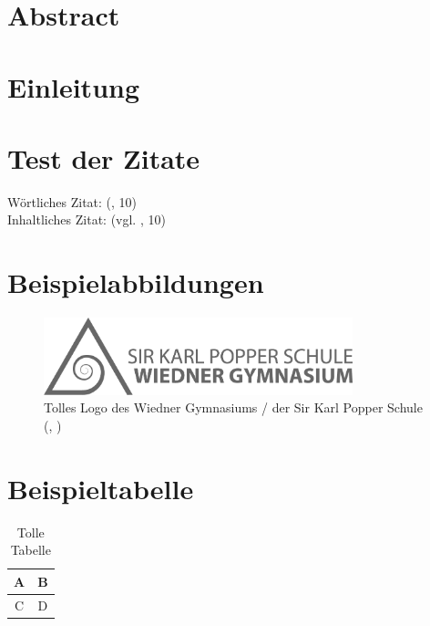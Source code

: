 \documentclass[12pt, ngerman]{article}
\newcommand{\izit}[2][]{(vgl. \cite{#2}\if#1\empty\else, #1\fi)}
\newcommand{\wzit}[2][]{(\cite{#2}\if#1\empty\else, #1\fi)}
\renewcommand{\abstract}{\section*{Abstract}}
\begin{document}


\setcounter{page}{2}

\abstract
\clearpage
\tableofcontents
\clearpage
{}
\section{Einleitung}
\clearpage

\section{Test der Zitate}
Wörtliches Zitat: \wzit[10]{panganos14} \\
Inhaltliches Zitat: \izit[10]{panganos14}

\section{Beispielabbildungen}
\begin{figure}[h!]
    \centering
    \includegraphics[width=0.8\textwidth]{logo.png}
    \caption{Tolles Logo des Wiedner Gymnasiums / der Sir Karl Popper Schule \wzit{author_fig}}
\end{figure}

\section{Beispieltabelle}
\begin{table}[h!]
    \centering
    \begin{tabular}{|c|c|}
        A & B \\ \hline
        C & D
    \end{tabular}
    \caption{Tolle Tabelle}
\end{table}


\clearpage
\printbibliography[title=\section{Literaturverzeichnis}]
\listoffigures
\listoftables
\end{document}
